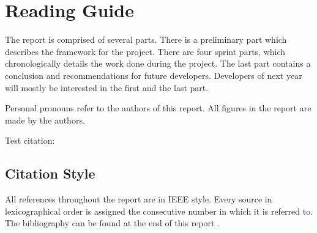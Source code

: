 \chapter*{Reading Guide}
The report is comprised of several parts. There is a preliminary part which describes the framework for the project. There are four sprint parts, which chronologically details the work done during the project. The last part contains a conclusion and recommendations for future developers. Developers of next year will mostly be interested in the first and the last part.

Personal pronouns refer to the authors of this report. All figures in the report are made by the authors.

Test citation: \cite{AndroidLint}

\section*{Citation Style}
All references throughout the report are in IEEE style. Every source in lexicographical order is assigned the consecutive number in which it is referred to. The bibliography can be found at the end of this report .